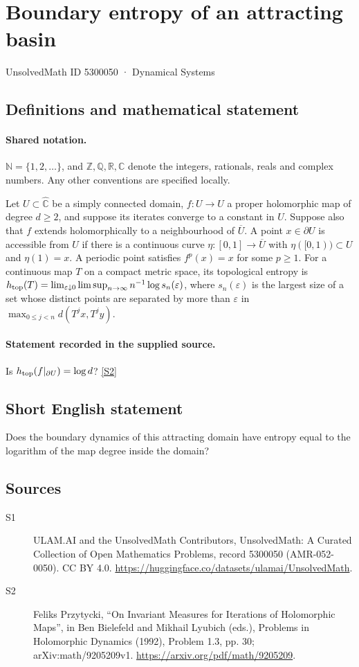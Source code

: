 \documentclass[11pt]{article}
\newcommand{\sref}[2]{\hyperlink{source:#1:#2}{[S#2]}}
\begin{document}
\setcounter{section}{5300049}
\section{Boundary entropy of an attracting basin}\label{5300050}
{\small\sffamily UnsolvedMath ID 5300050 · Dynamical Systems}
\subsection{Definitions and mathematical statement}

\paragraph{Shared notation.}$\mathbb N=\{1,2,\ldots\}$, and $\mathbb Z,\mathbb Q,\mathbb R,\mathbb C$ denote the integers, rationals, reals and complex numbers. Any other conventions are specified locally.


Let $U\subset\widehat{\mathbb C}$ be a simply connected domain, $f:U\to U$ a proper holomorphic map of degree $d\geq2$, and suppose its iterates converge to a constant in $U$. Suppose also that $f$ extends holomorphically to a neighbourhood of $\overline U$. A point $x\in\partial U$ is accessible from $U$ if there is a continuous curve $\eta:[0,1]\to\overline U$ with $\eta([0,1))\subset U$ and $\eta(1)=x$. A periodic point satisfies $f^p(x)=x$ for some $p\geq1$. For a continuous map $T$ on a compact metric space, its topological entropy is $h_{\rm top}(T)=\lim_{\varepsilon\downarrow0}\limsup_{n\to\infty}n^{-1}\log s_n(\varepsilon)$, where $s_n(\varepsilon)$ is the largest size of a set whose distinct points are separated by more than $\varepsilon$ in $\max_{0\leq j<n}d(T^jx,T^jy)$.
\paragraph{Statement recorded in the supplied source.}
Is $h_{\rm top}(f|_{\partial U})=\log d$? \sref{5300050}{2}
\subsection{Short English statement}
Does the boundary dynamics of this attracting domain have entropy equal to the logarithm of the map degree inside the domain?
\subsection{Sources}
\begin{description}
\item[\hypertarget{source:5300050:1}{S1}] ULAM.AI and the UnsolvedMath Contributors, UnsolvedMath: A Curated Collection of Open Mathematics Problems, record 5300050 (AMR-052-0050). CC BY 4.0. \url{https://huggingface.co/datasets/ulamai/UnsolvedMath}.
\item[\hypertarget{source:5300050:2}{S2}] Feliks Przytycki, ``On Invariant Measures for Iterations of Holomorphic Maps'', in Ben Bielefeld and Mikhail Lyubich (eds.), Problems in Holomorphic Dynamics (1992), Problem 1.3, pp. 30; arXiv:math/9205209v1. \url{https://arxiv.org/pdf/math/9205209}.
\end{description}
\label{end:5300050}
\end{document}
